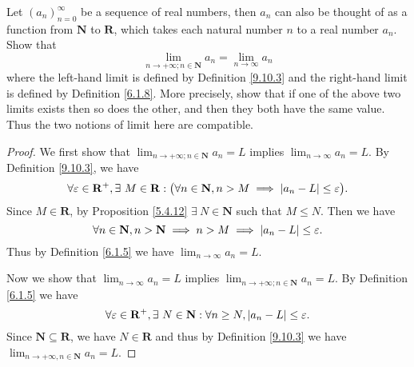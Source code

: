 \exercisesection

\begin{exercise}\label{ex 9.10.1}
    Let \((a_n)_{n = 0}^\infty\) be a sequence of real numbers, then \(a_n\) can also be thought of as a function from \(\mathbf{N}\) to \(\mathbf{R}\), which takes each natural number \(n\) to a real number \(a_n\).
    Show that
    \[
        \lim_{n \to +\infty ; n \in \mathbf{N}} a_n = \lim_{n \to \infty} a_n
    \]
    where the left-hand limit is defined by Definition \ref{9.10.3} and the right-hand limit is defined by Definition \ref{6.1.8}.
    More precisely, show that if one of the above two limits exists then so does the other, and then they both have the same value.
    Thus the two notions of limit here are compatible.
\end{exercise}

\begin{proof}
    We first show that \(\lim_{n \to +\infty ; n \in \mathbf{N}} a_n = L\) implies \(\lim_{n \to \infty} a_n = L\).
    By Definition \ref{9.10.3}, we have
    \[
        \forall \varepsilon \in \mathbf{R}^+, \exists\ M \in \mathbf{R} : \big(\forall n \in \mathbf{N}, n > M \implies \abs*{a_n - L} \leq \varepsilon\big).
    \]
    Since \(M \in \mathbf{R}\), by Proposition \ref{5.4.12} \(\exists\ N \in \mathbf{N}\) such that \(M \leq N\).
    Then we have
    \[
        \forall n \in \mathbf{N}, n > \mathbf{N} \implies n > M \implies \abs*{a_n - L} \leq \varepsilon.
    \]
    Thus by Definition \ref{6.1.5} we have \(\lim_{n \to \infty} a_n = L\).

    Now we show that \(\lim_{n \to \infty} a_n = L\) implies \(\lim_{n \to +\infty ; n \in \mathbf{N}} a_n = L\).
    By Definition \ref{6.1.5} we have
    \[
        \forall \varepsilon \in \mathbf{R}^+, \exists\ N \in \mathbf{N} : \forall n \geq N, \abs*{a_n - L} \leq \varepsilon.
    \]
    Since \(\mathbf{N} \subseteq \mathbf{R}\), we have \(N \in \mathbf{R}\) and thus by Definition \ref{9.10.3} we have \(\lim_{n \to +\infty, n \in \mathbf{N}} a_n = L\).
\end{proof}